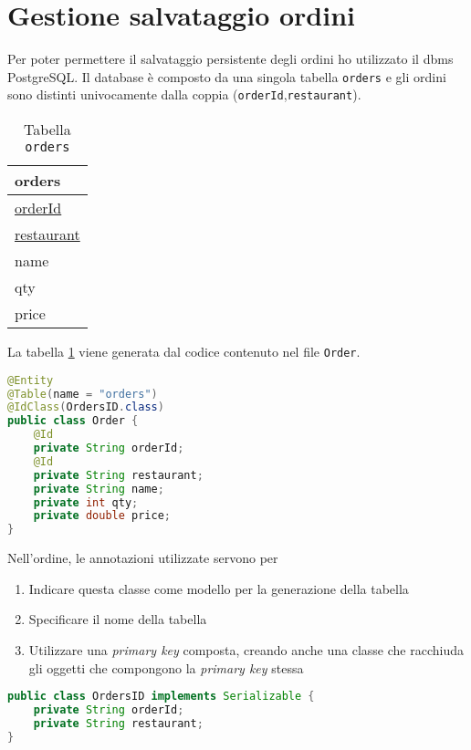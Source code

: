 \section{Gestione salvataggio ordini}
Per poter permettere il salvataggio persistente degli ordini ho utilizzato il \acrshort{dbms} PostgreSQL. Il database è composto da una singola tabella \texttt{orders} e gli ordini sono distinti univocamente dalla coppia (\texttt{orderId},\texttt{restaurant}).
\begin{table}[H]
    \centering
    \begin{tabular}{|p{3cm}|}
        \hline
        \textbf{orders}\\
        \hline
        \underline{orderId}\\
        \underline{restaurant}\\
        name\\
        qty\\
        price\\
        \hline
    \end{tabular}
    \caption{Tabella \texttt{orders}}
    \label{tab:orders}
\end{table}
La tabella \ref{tab:orders} viene generata dal codice contenuto nel file \texttt{Order}.
\begin{lstlisting}[language=Java, caption=Frammento codice tabella \texttt{orders}, basicstyle=\footnotesize]
@Entity
@Table(name = "orders")
@IdClass(OrdersID.class)
public class Order {
    @Id
    private String orderId;
    @Id
    private String restaurant;
    private String name;
    private int qty;
    private double price;
}
\end{lstlisting}
Nell'ordine, le annotazioni utilizzate servono per
\begin{enumerate}
    \item Indicare questa classe come modello per la generazione della tabella
    \item Specificare il nome della tabella
    \item Utilizzare una \textit{primary key} composta, creando anche una classe che racchiuda gli oggetti che compongono la \textit{primary key} stessa
\end{enumerate}
\begin{lstlisting}[language=Java, caption=Classe per utilizzare \textit{primary key} composta, basicstyle=\footnotesize]
public class OrdersID implements Serializable {
    private String orderId;
    private String restaurant;
}
\end{lstlisting}

